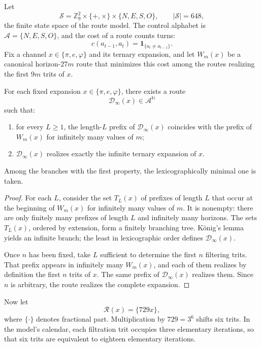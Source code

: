 Let
\[
\mathcal S
=\mathbb Z_9^2
\times\{+,\times\}
\times\{N,E,S,O\},
\qquad
|\mathcal S|=648,
\]
the finite state space of the route model. The control alphabet is
\(\mathcal A=\{N,E,S,O\}\), and the cost of a route counts turns:
\[
c(a_{t-1},a_t)=\mathbf1_{\{a_t\neq a_{t-1}\}}.
\]
Fix a channel \(x\in\{\pi,e,\varphi\}\) and its ternary expansion, and let
\(W_m(x)\) be a canonical horizon-\(27m\) route that minimizes this cost
among the routes realizing the first \(9m\) trits of \(x\).

\begin{theorem}
\label{thm:rayo-coinductivo-condicionado-rev6}
For each fixed expansion \(x\in\{\pi,e,\varphi\}\), there exists a route
\[
\mathcal D_\infty(x)\in\mathcal A^{\mathbb N}
\]
such that:
\begin{enumerate}
\item for every \(L\geq1\), the length-\(L\) prefix of
\(\mathcal D_\infty(x)\) coincides with the prefix of \(W_m(x)\) for
infinitely many values of \(m\);
\item \(\mathcal D_\infty(x)\) realizes exactly the infinite ternary
expansion of \(x\).
\end{enumerate}
Among the branches with the first property, the lexicographically minimal one is taken.
\end{theorem}

\begin{proof}
For each \(L\), consider the set \(T_L(x)\) of prefixes of length
\(L\) that occur at the beginning of \(W_m(x)\) for infinitely many values of
\(m\). It is nonempty: there are only finitely many prefixes of length \(L\) and
infinitely many horizons. The sets \(T_L(x)\), ordered by extension,
form a finitely branching tree. König's lemma yields an infinite
branch; the least in lexicographic order defines
\(\mathcal D_\infty(x)\).

Once \(n\) has been fixed, take \(L\) sufficient to determine the first \(n\)
filtering trits. That prefix appears in infinitely many \(W_m(x)\), and each of
them realizes by definition the first \(n\) trits of \(x\). The same
prefix of \(\mathcal D_\infty(x)\) realizes them. Since \(n\) is arbitrary,
the route realizes the complete expansion.
\end{proof}

Now let
\[
\mathcal R(x)=\{729x\},
\]
where \(\{\cdot\}\) denotes fractional part. Multiplication by
\(729=3^6\) shifts six trits. In the model's calendar, each filtration trit
occupies three elementary iterations, so that six trits
are equivalent to eighteen elementary iterations.

